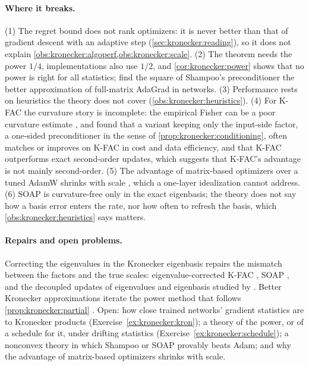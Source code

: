 \begin{refsection}
\paragraph{Where it breaks.} (1) The regret bound does not rank optimizers: it is never better than that of gradient descent with an adaptive step (\cref{sec:kronecker:reading}), so it does not explain \cref{obs:kronecker:algoperf,obs:kronecker:scale}. (2) The theorem needs the power $1/4$, implementations also use $1/2$, and \cref{cor:kronecker:power} shows that no power is right for all statistics; \textcite{MorwaniEtAl2025} find the square of Shampoo's preconditioner the better approximation of full-matrix AdaGrad in networks. (3) Performance rests on heuristics the theory does not cover (\cref{obs:kronecker:heuristics}). (4) For K-FAC the curvature story is incomplete: the empirical Fisher can be a poor curvature estimate \parencite{KunstnerHennigBalles2019}, and \textcite{Benzing2022} found that a variant keeping only the input-side factor, a one-sided preconditioner in the sense of \cref{prop:kronecker:conditioning}, often matches or improves on K-FAC in cost and data efficiency, and that K-FAC outperforms exact second-order updates, which suggests that K-FAC's advantage is not mainly second-order. (5) The advantage of matrix-based optimizers over a tuned AdamW shrinks with scale \parencite{WenEtAl2026Fantastic}, which a one-layer idealization cannot address. (6) SOAP is curvature-free only in the exact eigenbasis; the theory does not say how a basis error enters the rate, nor how often to refresh the basis, which \cref{obs:kronecker:heuristics} says matters.

\paragraph{Repairs and open problems.} Correcting the eigenvalues in the Kronecker eigenbasis repairs the mismatch between the factors and the true scales: eigenvalue-corrected K-FAC \parencite{GeorgeEtAl2018}, SOAP \parencite{VyasEtAl2025}, and the decoupled updates of eigenvalues and eigenbasis studied by \textcite{EschenhagenEtAl2025}. Better Kronecker approximations iterate the power method that follows \cref{prop:kronecker:partial} \parencite{VanLoanPitsianis1993,MorwaniEtAl2025}. Open: how close trained networks' gradient statistics are to Kronecker products (Exercise~\ref{ex:kronecker:kron}); a theory of the power, or of a schedule for it, under drifting statistics (Exercise~\ref{ex:kronecker:schedule}); a nonconvex theory in which Shampoo or SOAP provably beats Adam; and why the advantage of matrix-based optimizers shrinks with scale.


\end{refsection}
